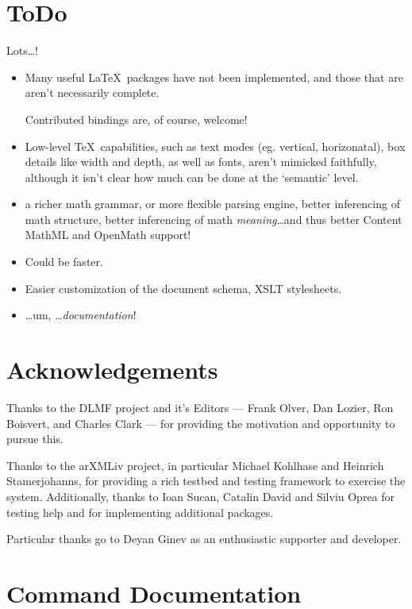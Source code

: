 \documentclass{book}
\begin{document}
\chapter{ToDo}\label{todo}
Lots\ldots!
\begin{itemize}
\item Many useful \LaTeX\ packages have not been implemented, and those
  that are aren't necessarily complete.

  Contributed bindings are, of course, welcome!
\item Low-level \TeX\ capabilities, such as text modes (eg. vertical, horizonatal),
 box details like width and depth, as well as fonts,  aren't mimicked faithfully,
  although it isn't clear how much can be done at the `semantic' level.
\item a richer math grammar, or more flexible parsing engine,
  better inferencing of math structure,
  better inferencing of math \emph{meaning}\ldots and thus better
  Content MathML and OpenMath support!
\item Could be faster.
\item Easier customization of the document schema, XSLT stylesheets.
\item \ldots um, \ldots \emph{documentation}!
\end{itemize}

\chapter*{Acknowledgements}\label{acknowledgements}
Thanks to the DLMF project and it's Editors ---
Frank Olver, Dan Lozier, Ron Boisvert, and Charles Clark ---
for providing the motivation and opportunity to pursue this.

Thanks to the arXMLiv project, in particular Michael Kohlhase and Heinrich Stamerjohanns,
for providing a rich testbed and testing framework to exercise the system.
Additionally, thanks to Ioan Sucan, 
Catalin David and Silviu Oprea for testing help and for implementing additional packages.

Particular thanks go to Deyan Ginev as an enthusiastic supporter and
developer.
\appendix
\setcounter{secnumdepth}{1}%
\chapter[Commands]{Command Documentation}\label{commands}
%
\makeatletter\def\verbatim@font{\small\normalfont\ttfamily}\makeatother




\end{document}
